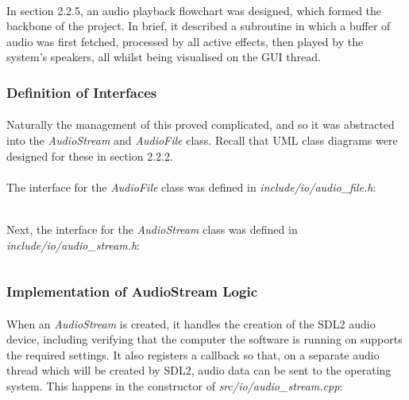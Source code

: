 \paragraph{}
In section 2.2.5, an audio playback flowchart was designed, which formed the backbone of the project. In brief, it described a subroutine in which a buffer of audio was first fetched, processed by all active effects, then played by the system's speakers, all whilst being visualised on the GUI thread.

\subsubsection{Definition of Interfaces}
\paragraph{}
Naturally the management of this proved complicated, and so it was abstracted into the \textit{AudioStream} and \textit{AudioFile} class. Recall that UML class diagrams were designed for these in section 2.2.2.

\paragraph{}
The interface for the \textit{AudioFile} class was defined in \textit{include/io/audio\_file.h}:
\inputminted[linenos]{c++}{../include/io/audio_file.h}

\pagebreak
\paragraph{}
Next, the interface for the \textit{AudioStream} class was defined in \textit{include/io/audio\_stream.h}:
\inputminted[linenos]{c++}{../include/io/audio_stream.h}

\pagebreak
\subsubsection{Implementation of AudioStream Logic}
\paragraph{}
When an \textit{AudioStream} is created, it handles the creation of the SDL2 audio device, including verifying that the computer the software is running on supports the required settings. It also registers a callback so that, on a separate audio thread which will be created by SDL2, audio data can be sent to the operating system. This happens in the constructor of \textit{src/io/audio\_stream.cpp}:
 \inputminted[linenos, firstline=6, lastline=54]{c++}{../src/io/audio_stream.cpp}
 
